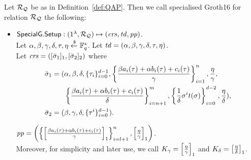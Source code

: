 \begin{definition}
\label{insta:sg16} Let $\mathcal{R}_{\mathcal{Q}}$ be as in Definition~\ref{def:QAP}. Then we call 
specialised Groth16 for relation $\mathcal{R}_{\mathcal{Q}}$ the following: %
\begin{itemize}
\item ${\mathsf{SpecialG}}.{\mathsf{Setup}}: (1^{\lambda}, \mathcal{R}_{\mathcal{Q}}) \mapsto (\mathit{crs}, \mathit{td},\mathit{pp})$. \\ 
\noindent Let $\alpha, \beta, \gamma, \delta, \tau, \eta  \xleftarrow{\$} \mathbb{F}_q^{*}$. Let $\mathit{td} = (\alpha, \beta, \gamma, \delta, \tau, \eta)$. \\ 
Let $\mathit{crs} = ([\bar{\sigma}_1]_1, [\bar{\sigma}_2]_2)$ where 
\begin{align*}
\bar{\sigma}_1 = (&\alpha, \beta, \delta, \{\tau_i\}_{i=0}^{d-1}, \left\{\frac{\beta a_i(\tau)+ \alpha b_i(\tau)+ c_i(\tau)}{\gamma}\right\}_{i=1}^n,  
\frac{\eta}{\gamma}, \\ 
&\left\{\frac{\beta a_i(\tau)+ \alpha b_i(\tau)+ c_i(\tau)}{\delta} \right\}_{i=n+1}^m, \left\{\frac{1}{\delta}\sigma^it(\sigma) \right\}_{i=0}^{d-2}, 
\frac{\eta}{\delta}), \\
\bar{\sigma}_2 = (&\beta, \gamma, \delta, \{\tau^i\}_{i=0}^{d-1}). 
\end{align*} 

$\mathit{pp} = \left( \left \{ \left[ \frac{\beta a_i(\tau)+ \alpha b_i(\tau)+ c_i(\tau)}{\gamma} \right]_1 \right \}_{i=l+1}^{n}, \left[ \frac{\eta}{\gamma} \right]_1 \right)$. \\
\noindent Moreover, for simplicity and later use, we call $K_{\gamma} = \left[\frac{\eta}{\gamma}\right]_1$  and $K_{\delta} = \left[ \frac{\eta}{\delta}\right] _1$.


\end{itemize}
\end{definition}
